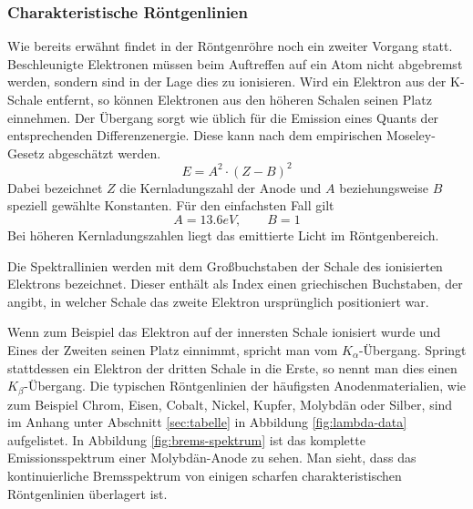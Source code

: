 
		\subsubsection{Charakteristische Röntgenlinien} %
		\label{ssub:charakteristische_rntgenlinien}

			Wie bereits erwähnt findet in der Röntgenröhre noch ein zweiter Vorgang statt.
			Beschleunigte Elektronen müssen beim Auftreffen auf ein Atom nicht abgebremst werden, sondern sind in der Lage dies zu ionisieren.
			Wird ein Elektron aus der K-Schale entfernt, so können Elektronen aus den höheren Schalen seinen Platz einnehmen.
			Der Übergang sorgt wie üblich für die Emission eines Quants der entsprechenden Differenzenergie.
			Diese kann nach dem empirischen Moseley-Gesetz abgeschätzt werden.
			\[ E = A^2 \cdot (Z-B)^2 \]
			Dabei bezeichnet $Z$ die Kernladungszahl der Anode und $A$ beziehungsweise $B$ speziell gewählte Konstanten.
			Für den einfachsten Fall gilt
			\[
				A = 13.6\unit{eV},\qquad B = 1
			\]
			Bei höheren Kernladungszahlen liegt das emittierte Licht im Röntgenbereich.

			Die Spektrallinien werden mit dem Großbuchstaben der Schale des ionisierten Elektrons bezeichnet.
			Dieser enthält als Index einen griechischen Buchstaben, der angibt, in welcher Schale das zweite Elektron ursprünglich positioniert war.

			Wenn zum Beispiel das Elektron auf der innersten Schale ionisiert wurde und Eines der Zweiten seinen Platz einnimmt, spricht man vom $K_\alpha$-Übergang.
			Springt stattdessen ein Elektron der dritten Schale in die Erste, so nennt man dies einen $K_\beta$-Übergang.
			Die typischen Röntgenlinien der häufigsten Anodenmaterialien, wie zum Beispiel Chrom, Eisen, Cobalt, Nickel, Kupfer, Molybdän oder Silber, sind im Anhang unter Abschnitt \ref{sec:tabelle} in Abbildung \ref{fig:lambda-data} aufgelistet.
			In Abbildung \ref{fig:brems-spektrum} ist das komplette Emissionsspektrum einer Molybdän-Anode zu sehen.
			Man sieht, dass das kontinuierliche Bremsspektrum von einigen scharfen charakteristischen Röntgenlinien überlagert ist.

